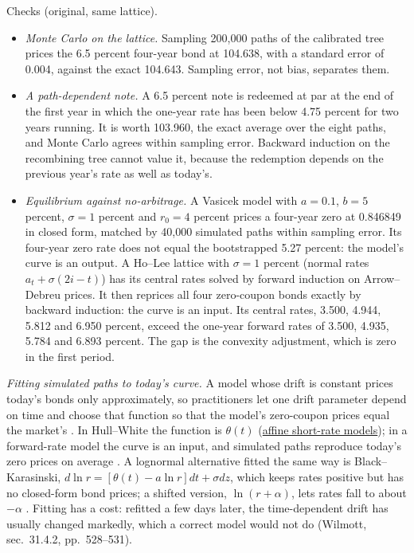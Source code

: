 \begin{qfmodel}
 Checks (original, same lattice).
\begin{itemize}
\item \emph{Monte Carlo on the lattice.} Sampling 200{,}000 paths of the calibrated tree prices the 6.5 percent four-year bond at 104.638, with a standard error of 0.004, against the exact 104.643. Sampling error, not bias, separates them.
\item \emph{A path-dependent note.} A 6.5 percent note is redeemed at par at the end of the first year in which the one-year rate has been below 4.75 percent for two years running. It is worth 103.960, the exact average over the eight paths, and Monte Carlo agrees within sampling error. Backward induction on the recombining tree cannot value it, because the redemption depends on the previous year's rate as well as today's.
\item \emph{Equilibrium against no-arbitrage.} A Vasicek model with $a=0.1$, $b=5$ percent, $\sigma=1$ percent and $r_0=4$ percent prices a four-year zero at 0.846849 in closed form, matched by 40{,}000 simulated paths within sampling error. Its four-year zero rate does not equal the bootstrapped 5.27 percent: the model's curve is an output. A Ho--Lee lattice with $\sigma=1$ percent (normal rates $a_t+\sigma(2i-t)$) has its central rates solved by forward induction on Arrow--Debreu prices. It then reprices all four zero-coupon bonds exactly by backward induction: the curve is an input. Its central rates, 3.500, 4.944, 5.812 and 6.950 percent, exceed the one-year forward rates of 3.500, 4.935, 5.784 and 6.893 percent. The gap is the convexity adjustment, which is zero in the first period.
\end{itemize}

\emph{Fitting simulated paths to today's curve.} A model whose drift is constant prices today's bonds only approximately, so practitioners let one drift parameter depend on time and choose that function so that the model's zero-coupon prices equal the market's \citep[chap.~31, secs.~31.1--31.3, pp.~525--527]{wide-wilmott-pwoqf}. In Hull--White the function is $\theta(t)$ (\hyperref[mod:affine-short-rate-models]{affine short-rate models}); in a forward-rate model the curve is an input, and simulated paths reproduce today's zero prices on average \citep[chap.~37, p.~863]{s7-fabozzifixed}. A lognormal alternative fitted the same way is Black--Karasinski, $d\ln r=[\theta(t)-a\ln r]dt+\sigma dz$, which keeps rates positive but has no closed-form bond prices; a shifted version, $\ln(r+\alpha)$, lets rates fall to about $-\alpha$ \citep[chap.~32, pp.~735--736 and~747]{s7-hulloptions}. Fitting has a cost: refitted a few days later, the time-dependent drift has usually changed markedly, which a correct model would not do (Wilmott, sec.~31.4.2, pp.~528--531).


\end{qfmodel}

